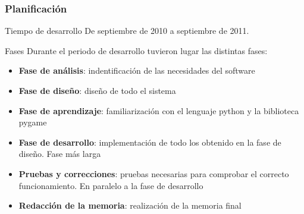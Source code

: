 

\begin{frame}
    \frametitle{Planificación}

        \begin{block}{Tiempo de desarrollo}
            De septiembre de 2010 a septiembre de 2011.
        \end{block}
    
        \begin{block}{Fases}
        Durante el periodo de desarrollo tuvieron lugar las distintas fases:
            \begin{itemize}
                \item \textbf{Fase de análisis}: indentificación de las necesidades del software
                \item \textbf{Fase de diseño}: diseño de todo el sistema
                \item \textbf{Fase de aprendizaje}: familiarización con el lenguaje python y la biblioteca pygame
                \item \textbf{Fase de desarrollo}: implementación de todo los obtenido en la fase de diseño. Fase más larga
                \item \textbf{Pruebas y correcciones}: pruebas necesarias para comprobar el correcto funcionamiento. En paralelo a
                la fase de desarrollo
                \item \textbf{Redacción de la memoria}: realización de la memoria final
            \end{itemize}
        \end{block}

\end{frame}

